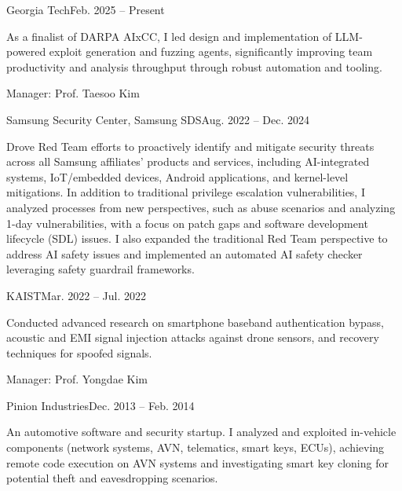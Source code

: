 \begin{timeitemize}{Georgia Tech}{Feb. 2025 -- Present}
    \item As a finalist of DARPA AIxCC, I led design and implementation of LLM-powered exploit generation and fuzzing agents, significantly improving team productivity and analysis throughput through robust automation and tooling.
    \item Manager: Prof. Taesoo Kim
\end{timeitemize}

\begin{timeitemize}{Samsung Security Center, Samsung SDS}{Aug. 2022 -- Dec. 2024}
    \item Drove Red Team efforts to proactively identify and mitigate security threats across all Samsung affiliates' products and services, including AI-integrated systems, IoT/embedded devices, Android applications, and kernel-level mitigations.
    In addition to traditional privilege escalation vulnerabilities, I analyzed processes from new perspectives, such as abuse scenarios and analyzing 1-day vulnerabilities, with a focus on patch gaps and software development lifecycle (SDL) issues.
    I also expanded the traditional Red Team perspective to address AI safety issues and implemented an automated AI safety checker leveraging safety guardrail frameworks.
\end{timeitemize}

\begin{timeitemize}{KAIST}{Mar. 2022 -- Jul. 2022}
    \item Conducted advanced research on smartphone baseband authentication bypass, acoustic and EMI signal injection attacks against drone sensors, and recovery techniques for spoofed signals.
    \item Manager: Prof. Yongdae Kim
\end{timeitemize}

\begin{timeitemize}{Pinion Industries}{Dec. 2013 -- Feb. 2014}
    \item An automotive software and security startup. I analyzed and exploited in-vehicle components (network systems, AVN, telematics, smart keys, ECUs), achieving remote code execution on AVN systems and investigating smart key cloning for potential theft and eavesdropping scenarios.
\end{timeitemize}


